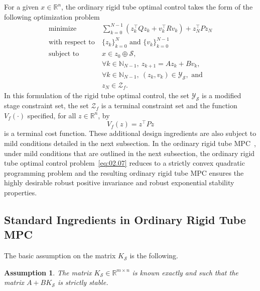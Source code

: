 \documentclass[twocolumn]{autart}
\newtheorem{assumption}{Assumption}
\newcommand{\mb}[1]{\mathbb{#1}}
\newcommand{\mc}[1]{\mathcal{#1}}
\newcommand{\bb}{\left(\cdot\right)}
\newcommand{\N}{\mb{N}}
\newcommand{\R}{\mb{R}}
\newcommand{\Rnm}[2]{\R^{{#1}\times{#2}}}
\numberwithin{equation}{section}
\begin{document}
For a given $x\in\R^n$, the ordinary rigid tube optimal control takes the form of the following optimization problem
\begin{align}
\text{minimize}\ &\sum_{k=0}^{N-1} (z_k^\top Q z_k+v_k^\top R v_k) + z_N^\top P z_N\nonumber\\
\text{with respect to}\ &\{z_k\}_{k=0}^N\text{ and }\{v_k\}_{k=0}^{N-1}\nonumber\\
\text{subject to}\ &x\in z_0\oplus \mc{S},\nonumber\\
&\forall k\in\N_{N-1},\ z_{k+1}=Az_k+Bv_k,\nonumber\\
&\forall k\in\N_{N-1},\ (z_k,v_k)\in\mc{Y}_{\mc{S}},\text{ and}\nonumber\\
\label{eq:02.07}
&z_N\in\mc{Z}_f.
\end{align}
In this formulation of the rigid tube optimal control, the set $\mc{Y}_\mc{S}$ is a modified stage constraint set, the set $\mc{Z}_f$ is a terminal constraint set and the function $V_f\bb$ specified, for all $z\in\R^n$, by 
\begin{equation}
\label{eq:02.08}
V_f(z)=z^\top P z
\end{equation}
is a terminal cost function. These additional design ingredients are also subject to mild conditions detailed in the next subsection. In the ordinary rigid tube MPC~\cite{mayne:seron:rakovic:2005}, under mild conditions that are outlined in the next subsection, the ordinary rigid tube optimal control problem~\eqref{eq:02.07} reduces to a strictly convex quadratic programming problem and the resulting ordinary rigid tube MPC ensures the highly desirable robust positive invariance and robust exponential stability properties. 

\subsection{Standard Ingredients in Ordinary Rigid Tube MPC}
\label{sec:02.03}

The basic assumption on the matrix $K_\mc{S}$ is the following.
\begin{assumption} 
\label{ass:02.05}
 The matrix $K_\mc{S}\in\Rnm{m}{n}$ is known exactly and such that the matrix $A+BK_\mc{S}$ is strictly stable.
\end{assumption}
\end{document}
